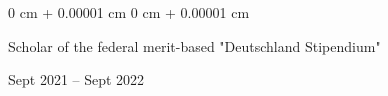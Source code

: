 \documentclass[10pt, letterpaper]{article}
\newenvironment{highlights}{
    \begin{itemize}[
        topsep=0.10 cm,
        parsep=0.10 cm,
        partopsep=0pt,
        itemsep=0pt,
        leftmargin=0 cm + 10pt
    ]
}{
    \end{itemize}
} %
\newenvironment{onecolentry}{
    \begin{adjustwidth}{
        0 cm + 0.00001 cm
    }{
        0 cm + 0.00001 cm
    }
}{
    \end{adjustwidth}
} %
\newenvironment{twocolentry}[2][]{
    \onecolentry
    \def\secondColumn{#2}
    \setcolumnwidth{\fill, 4.5 cm}
    \begin{paracol}{2}
}{
    \switchcolumn \raggedleft \secondColumn
    \end{paracol}
    \endonecolentry
} %
\begin{document}

        \begin{twocolentry} {
        Sept 2021 – Sept 2022
        }
            Scholar of the federal merit-based "Deutschland Stipendium"
        \end{twocolentry}





            


            

            

    
\end{document}
